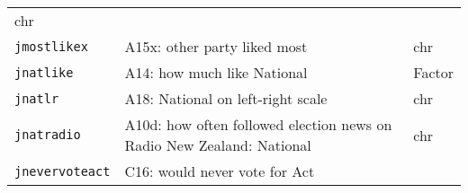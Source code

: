 \documentclass[]{article}
\begin{document}
\begin{longtable}[]{@{}lll@{}}
\begin{minipage}[t]{0.08\columnwidth}
chr\strut
\end{minipage}\tabularnewline
\begin{minipage}[t]{0.14\columnwidth}\raggedright\strut
\texttt{jmostlikex}\strut
\end{minipage} & \begin{minipage}[t]{0.70\columnwidth}\raggedright\strut
A15x: other party liked most\strut
\end{minipage} & \begin{minipage}[t]{0.08\columnwidth}\raggedright\strut
chr\strut
\end{minipage}\tabularnewline
\begin{minipage}[t]{0.14\columnwidth}\raggedright\strut
\texttt{jnatlike}\strut
\end{minipage} & \begin{minipage}[t]{0.70\columnwidth}\raggedright\strut
A14: how much like National\strut
\end{minipage} & \begin{minipage}[t]{0.08\columnwidth}\raggedright\strut
Factor\strut
\end{minipage}\tabularnewline
\begin{minipage}[t]{0.14\columnwidth}\raggedright\strut
\texttt{jnatlr}\strut
\end{minipage} & \begin{minipage}[t]{0.70\columnwidth}\raggedright\strut
A18: National on left-right scale\strut
\end{minipage} & \begin{minipage}[t]{0.08\columnwidth}\raggedright\strut
chr\strut
\end{minipage}\tabularnewline
\begin{minipage}[t]{0.14\columnwidth}\raggedright\strut
\texttt{jnatradio}\strut
\end{minipage} & \begin{minipage}[t]{0.70\columnwidth}\raggedright\strut
A10d: how often followed election news on Radio New Zealand:
National\strut
\end{minipage} & \begin{minipage}[t]{0.08\columnwidth}\raggedright\strut
chr\strut
\end{minipage}\tabularnewline
\begin{minipage}[t]{0.14\columnwidth}\raggedright\strut
\texttt{jnevervoteact}\strut
\end{minipage} & \begin{minipage}[t]{0.70\columnwidth}\raggedright\strut
C16: would never vote for Act\strut

\end{minipage}
\end{longtable}
\end{document}
